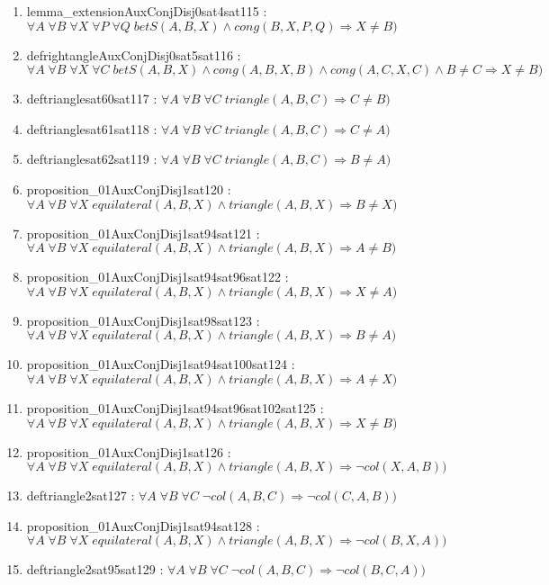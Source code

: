 \documentclass{article}
\begin{document}
\begin{enumerate}
\item lemma\_extensionAuxConjDisj0sat4sat115 : $\forall A\;\forall B\;\forall X\;\forall P\;\forall Q\;betS(A, B, X)\wedge cong(B, X, P, Q) \Rightarrow X \neq B)$
\item defrightangleAuxConjDisj0sat5sat116 : $\forall A\;\forall B\;\forall X\;\forall C\;betS(A, B, X)\wedge cong(A, B, X, B)\wedge cong(A, C, X, C)\wedge B \neq C \Rightarrow X \neq B)$
\item deftrianglesat60sat117 : $\forall A\;\forall B\;\forall C\;triangle(A, B, C) \Rightarrow C \neq B)$
\item deftrianglesat61sat118 : $\forall A\;\forall B\;\forall C\;triangle(A, B, C) \Rightarrow C \neq A)$
\item deftrianglesat62sat119 : $\forall A\;\forall B\;\forall C\;triangle(A, B, C) \Rightarrow B \neq A)$
\item proposition\_01AuxConjDisj1sat120 : $\forall A\;\forall B\;\forall X\;equilateral(A, B, X)\wedge triangle(A, B, X) \Rightarrow B \neq X)$
\item proposition\_01AuxConjDisj1sat94sat121 : $\forall A\;\forall B\;\forall X\;equilateral(A, B, X)\wedge triangle(A, B, X) \Rightarrow A \neq B)$
\item proposition\_01AuxConjDisj1sat94sat96sat122 : $\forall A\;\forall B\;\forall X\;equilateral(A, B, X)\wedge triangle(A, B, X) \Rightarrow X \neq A)$
\item proposition\_01AuxConjDisj1sat98sat123 : $\forall A\;\forall B\;\forall X\;equilateral(A, B, X)\wedge triangle(A, B, X) \Rightarrow B \neq A)$
\item proposition\_01AuxConjDisj1sat94sat100sat124 : $\forall A\;\forall B\;\forall X\;equilateral(A, B, X)\wedge triangle(A, B, X) \Rightarrow A \neq X)$
\item proposition\_01AuxConjDisj1sat94sat96sat102sat125 : $\forall A\;\forall B\;\forall X\;equilateral(A, B, X)\wedge triangle(A, B, X) \Rightarrow X \neq B)$
\item proposition\_01AuxConjDisj1sat126 : $\forall A\;\forall B\;\forall X\;equilateral(A, B, X)\wedge triangle(A, B, X) \Rightarrow \neg col(X, A, B))$
\item deftriangle2sat127 : $\forall A\;\forall B\;\forall C\;\neg col(A, B, C) \Rightarrow \neg col(C, A, B))$
\item proposition\_01AuxConjDisj1sat94sat128 : $\forall A\;\forall B\;\forall X\;equilateral(A, B, X)\wedge triangle(A, B, X) \Rightarrow \neg col(B, X, A))$
\item deftriangle2sat95sat129 : $\forall A\;\forall B\;\forall C\;\neg col(A, B, C) \Rightarrow \neg col(B, C, A))$

\end{enumerate}
\end{document}
